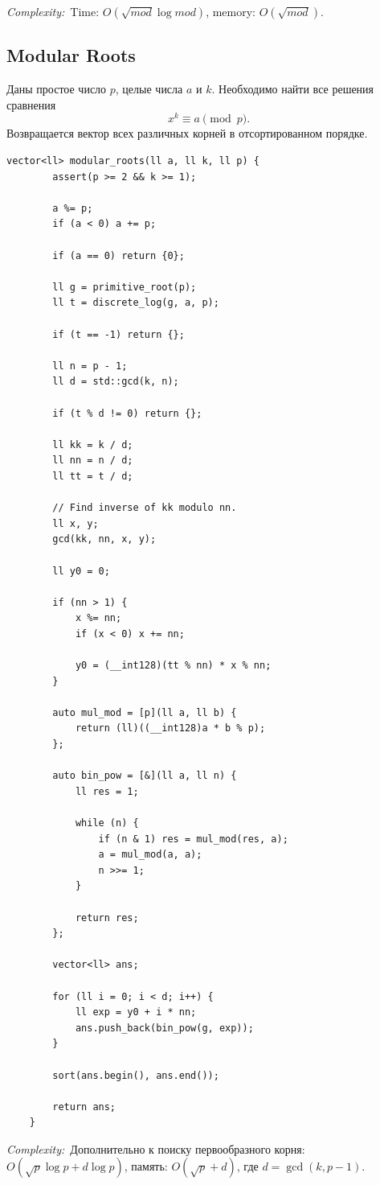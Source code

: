 \documentclass[10pt,a4paper]{article}
\newcommand{\complexity}[1]{\textit{Complexity:}~#1}
\begin{document}
\complexity{Time: $O(\sqrt{mod}\log mod)$, memory: $O(\sqrt{mod})$.}

\subsection*{Modular Roots}

Даны простое число $p$, целые числа $a$ и $k$.
Необходимо найти все решения сравнения
\[
x^k \equiv a \pmod p.
\]
Возвращается вектор всех различных корней в отсортированном порядке.

\begin{lstlisting}[style=cpp]
	vector<ll> modular_roots(ll a, ll k, ll p) {
		assert(p >= 2 && k >= 1);
		
		a %= p;
		if (a < 0) a += p;
		
		if (a == 0) return {0};
		
		ll g = primitive_root(p);
		ll t = discrete_log(g, a, p);
		
		if (t == -1) return {};
		
		ll n = p - 1;
		ll d = std::gcd(k, n);
		
		if (t % d != 0) return {};
		
		ll kk = k / d;
		ll nn = n / d;
		ll tt = t / d;
		
		// Find inverse of kk modulo nn.
		ll x, y;
		gcd(kk, nn, x, y);
		
		ll y0 = 0;
		
		if (nn > 1) {
			x %= nn;
			if (x < 0) x += nn;
			
			y0 = (__int128)(tt % nn) * x % nn;
		}
		
		auto mul_mod = [p](ll a, ll b) {
			return (ll)((__int128)a * b % p);
		};
		
		auto bin_pow = [&](ll a, ll n) {
			ll res = 1;
			
			while (n) {
				if (n & 1) res = mul_mod(res, a);
				a = mul_mod(a, a);
				n >>= 1;
			}
			
			return res;
		};
		
		vector<ll> ans;
		
		for (ll i = 0; i < d; i++) {
			ll exp = y0 + i * nn;
			ans.push_back(bin_pow(g, exp));
		}
		
		sort(ans.begin(), ans.end());
		
		return ans;
	}
\end{lstlisting}

\complexity{Дополнительно к поиску первообразного корня: $O(\sqrt p\log p+d\log p)$, память: $O(\sqrt p+d)$, где $d=\gcd(k,p-1)$.}
\end{document}
